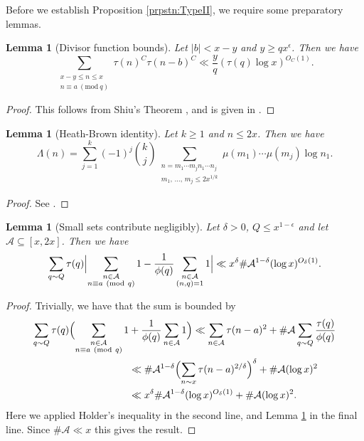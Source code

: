 \documentclass[10pt]{amsart}
\theoremstyle{plain}
\newtheorem{lmm}[thrm]{Lemma}
\numberwithin{equation}{section}
\newcommand{\Mod}[1]{\ (\mathrm{mod}\ #1)}
\begin{document}
%
%
%
%
%
%
%
%
Before we establish Proposition \ref{prpstn:TypeII}, we require some preparatory lemmas.
%
%
%
%
%
%
%
%
\begin{lmm}[Divisor function bounds]\label{lmm:Divisor}
Let $|b|< x-y$ and $y\ge q x^\epsilon$. Then we have
\[
\sum_{\substack{x-y\le n\le x\\ n\equiv a\Mod{q}}}\tau(n)^C\tau(n-b)^C\ll \frac{y}{q} (\tau(q)\log{x})^{O_{C}(1)}.
\]
\end{lmm}
%
%
%
%
\begin{proof}
This follows from Shiu's Theorem \cite{Shiu}, and is given in \cite[Lemma 12]{BFI2}.
\end{proof}
%
%
%
%
%
%
%
%
\begin{lmm}[Heath-Brown identity]\label{lmm:HeathBrown}
Let $k\ge 1$ and $n\le 2x$. Then we have
\[
\Lambda(n)=\sum_{j=1}^k (-1)^j \binom{k}{j}\sum_{\substack{n=m_1\cdots m_j n_1\cdots n_{j}\\ m_1,\,\dots,\,m_j\le 2x^{1/k}}}\mu(m_1)\cdots \mu(m_j)\log{n_{1}}.
\]
\end{lmm}
%
%
%
%
\begin{proof}
See \cite{HBVaughan}.
\end{proof}
%
%
%
%
%
%
%
%
\begin{lmm}[Small sets contribute negligibly]\label{lmm:SmallSets}
Let $\delta>0$, $Q\le x^{1-\epsilon}$ and let $\mathcal{A}\subseteq [x,2x]$. Then we have
\[
\sum_{q\sim Q}\tau(q)\Bigl|\sum_{\substack{n\in \mathcal{A}\\ n\equiv a\Mod{q}}}1-\frac{1}{\phi(q)}\sum_{\substack{n\in\mathcal{A}\\ (n,q)=1}}1\Bigr|\ll x^\delta\#\mathcal{A}^{1-\delta}(\log{x})^{O_\delta(1)}.
\]
\end{lmm}
%
%
%
%
\begin{proof}
Trivially, we have that the sum is bounded by
\begin{align*}
\sum_{q\sim Q}\tau(q)\Bigl(\sum_{\substack{n\in \mathcal{A}\\ n\equiv a\Mod{q}}}1&+\frac{1}{\phi(q)}\sum_{n\in\mathcal{A}}1\Bigr)
\ll \sum_{n\in\mathcal{A}}\tau(n-a)^2+\#\mathcal{A}\sum_{q\sim Q}\frac{\tau(q)}{\phi(q)}\\
&\ll \#\mathcal{A}^{1-\delta}\Bigl(\sum_{n\sim x}\tau(n-a)^{2/\delta}\Bigr)^{\delta}+\#\mathcal{A}(\log{x})^2\\
&\ll x^\delta \#\mathcal{A}^{1-\delta}(\log{x})^{O_\delta(1)}+\#\mathcal{A}(\log{x})^2.
\end{align*}
Here we applied Holder's inequality in the second line, and Lemma \ref{lmm:Divisor} in the final line. Since $\#\mathcal{A}\ll x$  this gives the result.
\end{proof}
\end{document}
